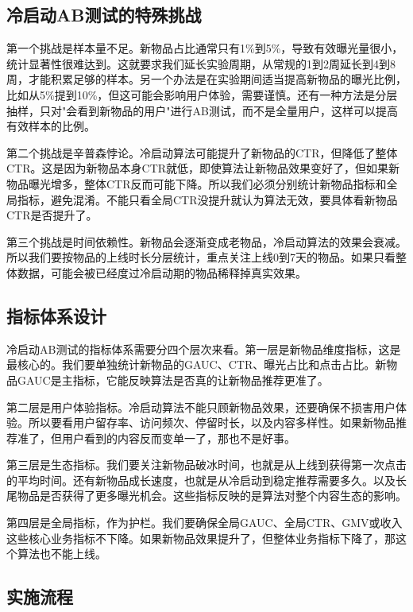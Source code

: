 \documentclass[UTF8]{ctexart}
\begin{document}
\subsection{冷启动AB测试的特殊挑战}

第一个挑战是样本量不足。新物品占比通常只有1\%到5\%，导致有效曝光量很小，统计显著性很难达到。这就要求我们延长实验周期，从常规的1到2周延长到4到8周，才能积累足够的样本。另一个办法是在实验期间适当提高新物品的曝光比例，比如从5\%提到10\%，但这可能会影响用户体验，需要谨慎。还有一种方法是分层抽样，只对"会看到新物品的用户"进行AB测试，而不是全量用户，这样可以提高有效样本的比例。

第二个挑战是辛普森悖论。冷启动算法可能提升了新物品的CTR，但降低了整体CTR。这是因为新物品本身CTR就低，即使算法让新物品效果变好了，但如果新物品曝光增多，整体CTR反而可能下降。所以我们必须分别统计新物品指标和全局指标，避免混淆。不能只看全局CTR没提升就认为算法无效，要具体看新物品CTR是否提升了。

第三个挑战是时间依赖性。新物品会逐渐变成老物品，冷启动算法的效果会衰减。所以我们要按物品的上线时长分层统计，重点关注上线0到7天的物品。如果只看整体数据，可能会被已经度过冷启动期的物品稀释掉真实效果。

\subsection{指标体系设计}

冷启动AB测试的指标体系需要分四个层次来看。第一层是新物品维度指标，这是最核心的。我们要单独统计新物品的GAUC、CTR、曝光占比和点击占比。新物品GAUC是主指标，它能反映算法是否真的让新物品推荐更准了。

第二层是用户体验指标。冷启动算法不能只顾新物品效果，还要确保不损害用户体验。所以要看用户留存率、访问频次、停留时长，以及内容多样性。如果新物品推荐准了，但用户看到的内容反而变单一了，那也不是好事。

第三层是生态指标。我们要关注新物品破冰时间，也就是从上线到获得第一次点击的平均时间。还有新物品成长速度，也就是从冷启动到稳定推荐需要多久。以及长尾物品是否获得了更多曝光机会。这些指标反映的是算法对整个内容生态的影响。

第四层是全局指标，作为护栏。我们要确保全局GAUC、全局CTR、GMV或收入这些核心业务指标不下降。如果新物品效果提升了，但整体业务指标下降了，那这个算法也不能上线。

\subsection{实施流程}
\end{document}
